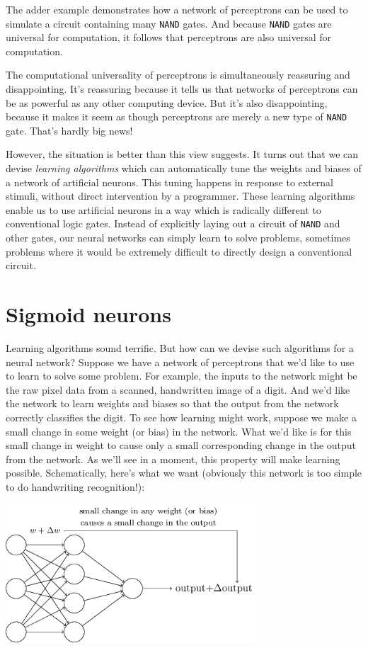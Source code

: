 The adder example demonstrates how a network of perceptrons can be used to simulate a circuit containing many \lstinline{NAND} gates. And because \lstinline{NAND} gates are universal for computation, it follows that perceptrons are also universal for computation.

The computational universality of perceptrons is simultaneously reassuring and disappointing. It's reassuring because it tells us that networks of perceptrons can be as powerful as any other computing device. But it's also disappointing, because it makes it seem as though perceptrons are merely a new type of \lstinline{NAND} gate. That's hardly big news!

However, the situation is better than this view suggests. It turns out that we can devise \textit{learning algorithms} which can automatically tune the weights and biases of a network of artificial neurons. This tuning happens in response to external stimuli, without direct intervention by a programmer. These learning algorithms enable us to use artificial neurons in a way which is radically different to conventional logic gates. Instead of explicitly laying out a circuit of \lstinline{NAND} and other gates, our neural networks can simply learn to solve problems, sometimes problems where it would be extremely difficult to directly design a conventional circuit.

\section{Sigmoid neurons}

Learning algorithms sound terrific. But how can we devise such algorithms for a neural network? Suppose we have a network of perceptrons that we'd like to use to learn to solve some problem. For example, the inputs to the network might be the raw pixel data from a scanned, handwritten image of a digit. And we'd like the network to learn weights and biases so that the output from the network correctly classifies the digit. To see how learning might work, suppose we make a small change in some weight (or bias) in the network. What we'd like is for this small change in weight to cause only a small corresponding change in the output from the network. As we'll see in a moment, this property will make learning possible. Schematically, here's what we want (obviously this network is too simple to do handwriting recognition!):

{\centering
\includegraphics[width=0.7\textwidth,]{pic/simpleperceptron02}
\par}


